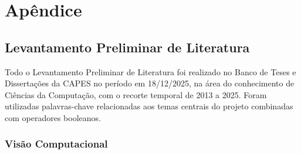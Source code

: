 \section*{Apêndice}

\subsection*{Levantamento Preliminar de Literatura}
Todo o Levantamento Preliminar de Literatura foi realizado no Banco de Teses e Dissertações da CAPES no período em 18/12/2025, na área do conhecimento de Ciências da Computação, com o recorte temporal de 2013 a 2025. Foram utilizadas palavras-chave relacionadas aos temas centrais do projeto combinadas com operadores booleanos.
\subsubsection{Visão Computacional}

